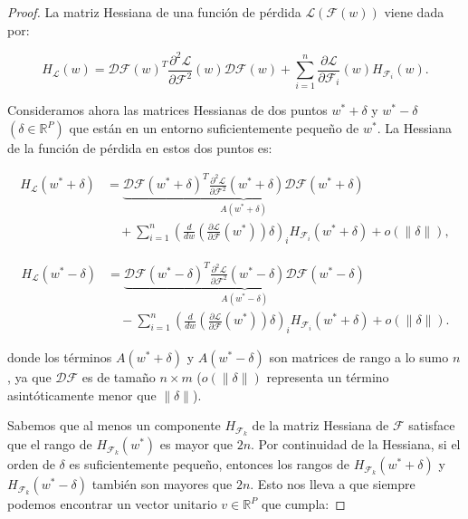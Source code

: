 \begin{proof}
    La matriz Hessiana de una función de pérdida $\mathcal{L}(\mathcal{F}(w))$ viene dada por:

    \[
        H_{\mathcal{L}}(w) = \mathcal{DF}(w)^T \frac{\partial^2 \mathcal{L}}{\partial \mathcal{F}^2}(w) \mathcal{DF}(w) + \sum_{i=1}^{n} \frac{\partial \mathcal{L}}{\partial \mathcal{F}_i}(w) H_{\mathcal{F}_i}(w).
    \]

    Consideramos ahora las matrices Hessianas de dos puntos $w^* + \delta $ y $w^* - \delta $ $(\delta \in \mathbb{R}^{P})$ que están en un entorno suficientemente pequeño de $w^*$. La Hessiana de la función de pérdida en estos dos puntos es:

    \begin{equation}\label{eq:non-convexity1}
        \begin{aligned}
            H_{\mathcal{L}}( w^* + \delta) &=  
            \underbrace{\mathcal{DF}( w^* + \delta)^T \frac{\partial^2 \mathcal{L}}{\partial \mathcal{F}^2}( w^* + \delta) \mathcal{DF}( w^* + \delta)}_{A( w^* + \delta)} \\
            &\quad + \sum_{i=1}^{n} \left( \frac{d}{d w} \left( \frac{\partial \mathcal{L}}{\partial \mathcal{F}}( w^*) \right) \delta \right)_i H_{\mathcal{F}_i}( w^* + \delta) + o(\|\delta\|),
        \end{aligned}
    \end{equation}
        
    \begin{align}
        H_{\mathcal{L}}( w^* - \delta) &=  
        \underbrace{\mathcal{DF}( w^* - \delta)^T \frac{\partial^2 \mathcal{L}}{\partial \mathcal{F}^2}( w^* - \delta) \mathcal{DF}( w^* - \delta)}_{A( w^* - \delta)} \nonumber \\
        &\quad - \sum_{i=1}^{n} \left( \frac{d}{d w} \left( \frac{\partial \mathcal{L}}{\partial \mathcal{F}}( w^*) \right) \delta \right)_i H_{\mathcal{F}_i}( w^* + \delta) + o(\|\delta\|).
    \end{align}
        

    donde los términos $ A( w^* + \delta) $ y $ A( w^* - \delta) $ son matrices de rango a lo sumo $ n $, ya que $ \mathcal{DF} $ es de tamaño $ n \times m $ ($o(\|\delta\|)$ representa un término asintóticamente menor que $\| \delta \|$).

    Sabemos que al menos un componente $ H_{\mathcal{F}_k} $ de la matriz Hessiana de $ \mathcal{F} $ satisface que el rango de $ H_{\mathcal{F}_k}( w^*) $ es mayor que $ 2n $. Por continuidad de la Hessiana, si el orden de $ \delta $ es suficientemente pequeño, entonces los rangos de $ H_{\mathcal{F}_k}( w^* + \delta) $ y $ H_{\mathcal{F}_k}( w^* - \delta) $ también son mayores que $ 2n $. Esto nos lleva a que siempre podemos encontrar un vector unitario $v \in \mathbb{R}^P $ que cumpla:


\end{proof}

